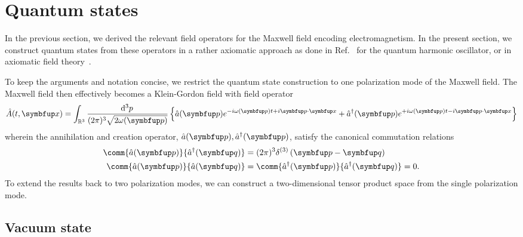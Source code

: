 \section{Quantum states}

In the previous section, we derived the relevant field operators for the Maxwell field encoding electromagnetism.
In the present section, we construct quantum states from these operators in a rather axiomatic approach as done in Ref.~\cite[p.~506]{Cohen2019} for the quantum harmonic oscillator, or in axiomatic field theory~\cite{Streater2016,Haag2012,Bogolubov1989}.

To keep the arguments and notation concise, we restrict the quantum state construction to one polarization mode of the Maxwell field.
The Maxwell field then effectively becomes a Klein-Gordon field with field operator
\begin{equation}
	\hat{A}(t,\vb{x})
	=
	\int_{\mathbb{R}^3}\frac{\dd[3]{p}}{(2\pi)^3\sqrt{2\omega(\vb{p})}}
	\left\{
		\hat{a}(\vb{p})
		e^{-i\omega(\vb{p})t+i\vb{p}\vdot\vb{x}}
		+
		\hat{a}^\dagger(\vb{p})
		e^{+i\omega(\vb{p})t-i\vb{p}\vdot\vb{x}}
	\right\}
	\label{eq:klein_gordon_operator}
\end{equation}
wherein the annihilation and creation operator, $\hat{a}(\vb{p}),\hat{a}^\dagger(\vb{p})$, satisfy the canonical commutation relations
\begin{align}
	\comm{\hat{a}(\vb{p})}{\hat{a}^\dagger(\vb{q})}
	&=
	(2\pi)^3\delta^{(3)}
	\left(\vb{p}-\vb{q}\right)
	\\
	\comm{\hat{a}(\vb{p})}{\hat{a}(\vb{q})}
	&=
	\comm{\hat{a}^\dagger(\vb{p})}{\hat{a}^\dagger(\vb{q})}
	=
	0
	\label{eq:klein_gordon_canonical_commutation_relation}.
\end{align}
To extend the results back to two polarization modes, we can construct a two-dimensional tensor product space from the single polarization mode.

\subsection{Vacuum state}


